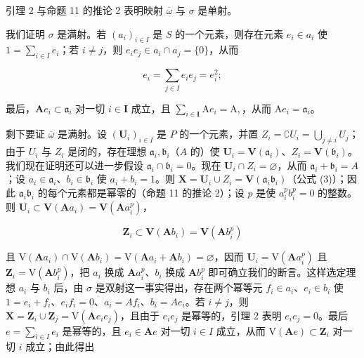 引理 2 与命题 11 的推论 2 表明映射 \(\overline{\omega}\) 与 \(\sigma\) 是单射。

我们证明 \(\sigma\) 是满射。若 \((a_{i})_{i\in I}\) 是 \(S\) 的一个元素，则存在元素 \(e_i\in a_i\) 使 \(1 = \sum_{i\in I}e_i\)；若 \(i\neq j\)，则 \(e_i e_j\in a_i\cap a_j = \{0\}\)，从而

\[
e _ {i} = \sum_ {j \in I} e _ {i} e _ {j} = e _ {i} ^ {2};
\]

最后，\(\mathbf{A}e_{i}\subset \mathfrak{a}_{i}\) 对一切 \(i\in \mathbf{I}\) 成立，且 \(\sum_{i\in \mathbf{I}}\mathrm{A}e_i = \mathrm{A},\)，从而 \(\mathrm{A}e_{i} = \mathfrak{a}_{i}\)。

剩下要证 \(\overline{\omega}\) 是满射。设 \((\mathbf{U}_i)_{i\in I}\) 是 \(P\) 的一个元素，并置 \(Z_{i} = \complement U_{i} = \bigcup_{j\neq i}U_{j}\)；由于 \(U_{i}\) 与 \(Z_{i}\) 是闭的，存在理想 \(\mathfrak{a}_i,\mathfrak{b}_i\)（\(A\) 的）使 \(\mathbf{U}_i = \mathbf{V}(\mathfrak{a}_i)\)、\(Z_{i} = \mathbf{V}(\mathfrak{b}_{i})\)。我们现在证明还可以进一步假设 \(\mathfrak{a}_i\cap \mathfrak{b}_i = 0\)。现在 \(\mathbf{U}_i\cap Z_i = \varnothing\)，从而 \(\mathfrak{a}_i + \mathfrak{b}_i = A\)；设 \(a_i\in \mathfrak{a}_i\)、\(b_{i}\in \mathfrak{b}_{i}\) 使 \(a_{i} + b_{i} = 1\)。则 \(\mathbf{X} = \mathbf{U}_i\cup Z_i = \mathbf{V}(\mathfrak{a}_i\mathfrak{b}_i)\)（公式 (3)）；因此 \(\mathfrak{a}_i\mathfrak{b}_i\) 的每个元素都是幂零的（命题 11 的推论 2）；设 \(p\) 是使 \(a_i^p b_i^p = 0\) 的整数。则 \(\mathbf{U}_i\subset \mathbf{V}(\mathbf{A}a_i) = \mathbf{V}(\mathbf{A}a_i^p)\)，

\[
\mathbf {Z} _ {i} \subset \mathbf {V} (\mathbf {A} b _ {i}) = \mathbf {V} (\mathbf {A} b _ {i} ^ {p})
\]

且 \(\mathrm{V}(\mathbf{A}a_i)\cap \mathrm{V}(\mathbf{A}b_i) = \mathrm{V}(\mathbf{A}a_i + \mathbf{A}b_i) = \varnothing\)，因而 \(\mathbf{U}_i = \mathrm{V}(\mathbf{A}a_i^p)\) 且 \(\mathbf{Z}_i = \mathrm{V}(\mathbf{A}b_i^p)\)，把 \(a_i\) 换成 \(\mathbf{A}a_i^p\)、\(b_i\) 换成 \(\mathbf{A}b_i^p\) 即可确立我们的断言。这样选定理想 \(a_i\) 与 \(b_i\) 后，由 \(\sigma\) 是双射这一事实得出，存在两个幂等元 \(f_i\in a_i\)、\(e_i\in b_i\) 使 \(1 = e_i + f_i\)、\(e_i f_i = 0\)、\(a_i = Af_i\)、\(b_i = Ae_i\)。若 \(i\neq j\)，则 \(\mathbf{X} = \mathbf{Z}_i\cup \mathbf{Z}_j = \mathrm{V}(\mathbf{A}e_i e_j)\)，且由于 \(e_i e_j\) 是幂等的，引理 2 表明 \(e_i e_j = 0\)。最后 \(e = \sum_{i\in I}e_i\) 是幂等的，且 \(e_i\in \mathbf{A}e\) 对一切 \(i\in I\) 成立，从而 \(\mathrm{V}(\mathbf{A}e)\subset \mathbf{Z}_i\) 对一切 \(i\) 成立；由此得出

